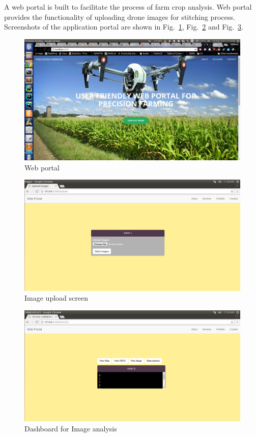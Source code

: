 A web portal is built to facilitate the process of farm crop analysis. Web portal provides the functionality of uploading drone images for stitching process. Screenshots of the application portal are shown in Fig.~\ref{fig: web_p}, Fig.~\ref{fig: res-1} and Fig.~\ref{fig: res-2}.



\begin{figure}[h]
	\includegraphics[width=1\linewidth]{webhost_precision}
	\centering
	\caption{\label{fig: web_p}Web portal}
\end{figure}
\begin{figure}[h]
	\includegraphics[width=1\linewidth]{fin_img_15}
	\centering
	\caption{\label{fig: res-1}Image upload screen}
\end{figure}
\begin{figure}[h]
	\includegraphics[width=1\linewidth]{fin_img_16}
	\centering
	\caption{\label{fig: res-2}Dashboard for Image analysis}
\end{figure}


